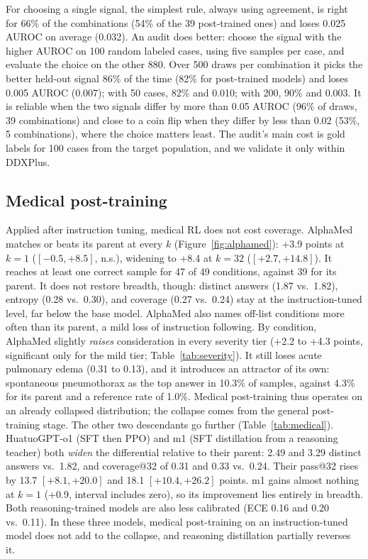 \documentclass[11pt]{article}
\begin{document}
For choosing a single signal, the simplest rule, always using agreement, is right for 66\% of the combinations (54\% of the 39 post-trained ones) and loses 0.025 AUROC on average (0.032). An audit does better: choose the signal with the higher AUROC on 100 random labeled cases, using five samples per case, and evaluate the choice on the other 880. Over 500 draws per combination it picks the better held-out signal 86\% of the time (82\% for post-trained models) and loses 0.005 AUROC (0.007); with 50 cases, 82\% and 0.010; with 200, 90\% and 0.003. It is reliable when the two signals differ by more than 0.05 AUROC (96\% of draws, 39 combinations) and close to a coin flip when they differ by less than 0.02 (53\%, 5 combinations), where the choice matters least. The audit's main cost is gold labels for 100 cases from the target population, and we validate it only within DDXPlus.

\subsection{Medical post-training}\label{sec:medical}
Applied after instruction tuning, medical RL does not cost coverage. AlphaMed matches or beats its parent at every $k$ (Figure~\ref{fig:alphamed}): +3.9 points at $k{=}1$ ($[-0.5,+8.5]$, n.s.), widening to +8.4 at $k{=}32$ ($[+2.7,+14.8]$). It reaches at least one correct sample for 47 of 49 conditions, against 39 for its parent.
It does not restore breadth, though: distinct answers (1.87 vs.\ 1.82), entropy (0.28 vs.\ 0.30), and coverage (0.27 vs.\ 0.24) stay at the instruction-tuned level, far below the base model.
AlphaMed also names off-list conditions more often than its parent, a mild loss of instruction following.
By condition, AlphaMed slightly \emph{raises} consideration in every severity tier (+2.2 to +4.3 points, significant only for the mild tier; Table~\ref{tab:severity}). It still loses acute pulmonary edema (0.31 to 0.13), and it introduces an attractor of its own: spontaneous pneumothorax as the top answer in 10.3\% of samples, against 4.3\% for its parent and a reference rate of 1.0\%.
Medical post-training thus operates on an already collapsed distribution; the collapse comes from the general post-training stage.
The other two descendants go further (Table~\ref{tab:medical}). HuatuoGPT-o1 (SFT then PPO) and m1 (SFT distillation from a reasoning teacher) both \emph{widen} the differential relative to their parent: 2.49 and 3.29 distinct answers vs.\ 1.82, and coverage@32 of 0.31 and 0.33 vs.\ 0.24. Their pass@32 rises by 13.7 $[+8.1,+20.0]$ and 18.1 $[+10.4,+26.2]$ points. m1 gains almost nothing at $k{=}1$ (+0.9, interval includes zero), so its improvement lies entirely in breadth. Both reasoning-trained models are also less calibrated (ECE 0.16 and 0.20 vs.\ 0.11). In these three models, medical post-training on an instruction-tuned model does not add to the collapse, and reasoning distillation partially reverses it.
\end{document}

